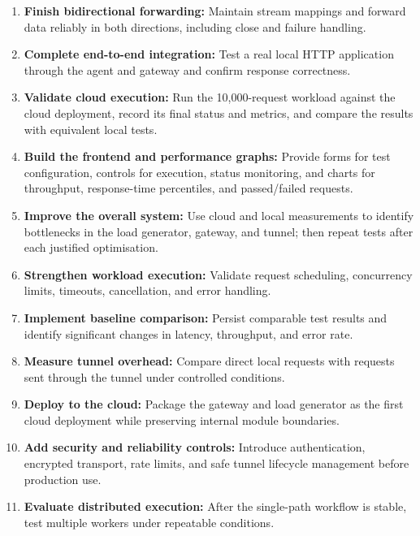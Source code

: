 \documentclass[11pt,a4paper,oneside]{report}
\begin{document}
\begin{enumerate}
  \item \textbf{Finish bidirectional forwarding:}
  Maintain stream mappings and forward data reliably in
  both directions, including close and failure handling.

  \item \textbf{Complete end-to-end integration:}
  Test a real local HTTP application through the agent and
  gateway and confirm response correctness.

  \item \textbf{Validate cloud execution:}
  Run the 10,000-request workload against the cloud deployment,
  record its final status and metrics, and compare the results
  with equivalent local tests.

  \item \textbf{Build the frontend and performance graphs:}
  Provide forms for test configuration, controls for execution,
  status monitoring, and charts for throughput, response-time
  percentiles, and passed/failed requests.

  \item \textbf{Improve the overall system:}
  Use cloud and local measurements to identify bottlenecks in
  the load generator, gateway, and tunnel; then repeat tests after
  each justified optimisation.

  \item \textbf{Strengthen workload execution:}
  Validate request scheduling, concurrency limits, timeouts,
  cancellation, and error handling.

  \item \textbf{Implement baseline comparison:}
  Persist comparable test results and identify significant
  changes in latency, throughput, and error rate.

  \item \textbf{Measure tunnel overhead:}
  Compare direct local requests with requests sent through
  the tunnel under controlled conditions.

  \item \textbf{Deploy to the cloud:}
  Package the gateway and load generator as the first cloud
  deployment while preserving internal module boundaries.

  \item \textbf{Add security and reliability controls:}
  Introduce authentication, encrypted transport, rate limits,
  and safe tunnel lifecycle management before production use.

  \item \textbf{Evaluate distributed execution:}
  After the single-path workflow is stable, test multiple
  workers under repeatable conditions.
\end{enumerate}
\end{document}
